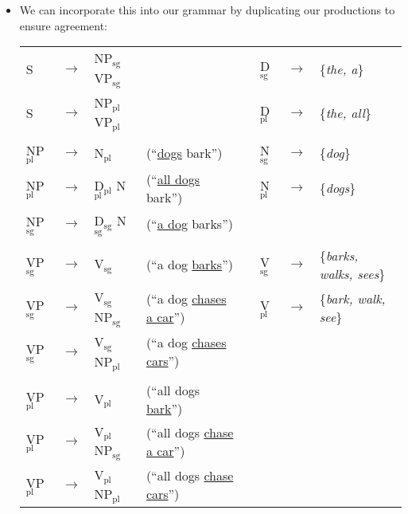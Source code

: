 \documentclass[11pt,letterpaper]{article}
\newcommand{\ra}{\ensuremath{\rightarrow}}
\begin{document}
\begin{itemize}
  \item We can incorporate this into our grammar by duplicating our productions to ensure agreement:
	\begin{center}
	\begin{tabular}{llll p{8mm} lll}
	  S & $\ra$ & NP$_{\text{sg}}$ VP$_{\text{sg}}$                &                                         && D$_{\text{sg}}$ & $\ra$ & \{\textit{the, a}\}      \\
	  S & $\ra$ & NP$_{\text{pl}}$ VP$_{\text{pl}}$                &                                         && D$_{\text{pl}}$ & $\ra$ & \{\textit{the, all}\}    \\
	  \\
	  NP$_{\text{pl}}$ & $\ra$ & N$_{\text{pl}}$                   & (``\underline{dogs} bark'')             && N$_{\text{sg}}$ & $\ra$ & \{\textit{dog}\}    \\
	  NP$_{\text{pl}}$ & $\ra$ & D$_{\text{pl}}$ N$_{\text{pl}}$   & (``\underline{all dogs} bark'')         && N$_{\text{pl}}$ & $\ra$ & \{\textit{dogs}\}    \\
	  NP$_{\text{sg}}$ & $\ra$ & D$_{\text{sg}}$ N$_{\text{sg}}$   & (``\underline{a dog} barks'')    \\
	  \\
	  VP$_{\text{sg}}$ & $\ra$ & V$_{\text{sg}}$                   & (``a dog \underline{barks}'')           && V$_{\text{sg}}$ & $\ra$ & \{\textit{barks, walks, sees}\} \\
	  VP$_{\text{sg}}$ & $\ra$ & V$_{\text{sg}}$ NP$_{\text{sg}}$  & (``a dog \underline{chases a car}'')    && V$_{\text{pl}}$ & $\ra$ & \{\textit{bark, walk, see}\} \\
	  VP$_{\text{sg}}$ & $\ra$ & V$_{\text{sg}}$ NP$_{\text{pl}}$  & (``a dog \underline{chases cars}'')     && \\
	  \\
	  VP$_{\text{pl}}$ & $\ra$ & V$_{\text{pl}}$                   & (``all dogs \underline{bark}'')         && \\
	  VP$_{\text{pl}}$ & $\ra$ & V$_{\text{pl}}$ NP$_{\text{sg}}$  & (``all dogs \underline{chase a car}'')  && \\
	  VP$_{\text{pl}}$ & $\ra$ & V$_{\text{pl}}$ NP$_{\text{pl}}$  & (``all dogs \underline{chase cars}'')   &&
	\end{tabular}
	\end{center}


\end{itemize}
\end{document}
